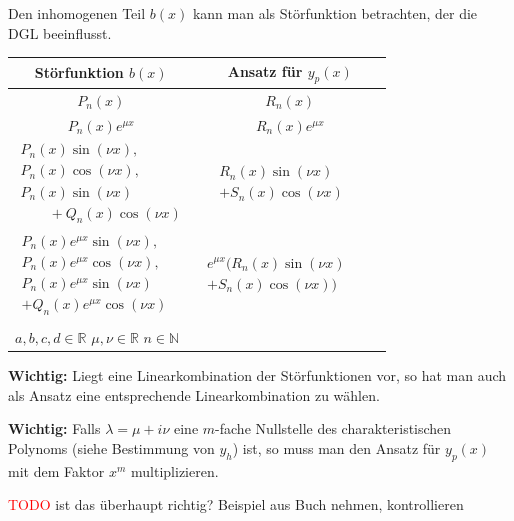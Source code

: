 \documentclass[a4paper,landscape,8pt]{extarticle}
\newcommand{\N}{\mathbb{N}}
\newcommand{\R}{\mathbb{R}}
\newcommand{\todo}{\textcolor{red}{TODO }}
\newcommand{\Wichtig}{\textbf{Wichtig: }}
\begin{document}
\begin{multicols*}{4}
\begin{warmup}
Den inhomogenen Teil $b(x)$ kann man als Störfunktion betrachten, der die
DGL beeinflusst.
\end{warmup}

\begin{table}[H]
\centering
\begin{tabular}{cc}
\toprule
\textbf{Störfunktion} $b(x)$ & \textbf{Ansatz für} $y_p(x)$\\
\midrule
$P_n(x)$ & $R_n(x)$
\\
\hline
$P_n(x)e^{\mu x}$ & $R_n(x)e^{\mu x}$
\\
\hline
$\begin{matrix}
P_n(x)\sin(\nu x),\\
P_n(x)\cos(\nu x),\\
P_n(x)\sin(\nu x)\qquad\\
\qquad + Q_n(x)\cos(\nu x)
\end{matrix}$
& 
$\begin{matrix}R_n(x)\sin(\nu x)\qquad\\ + S_n(x)\cos(\nu x)\end{matrix}$
\\
\hline
$\begin{matrix}
P_n(x)e^{\mu x}\sin(\nu x),\\
P_n(x)e^{\mu x}\cos(\nu x),\\
P_n(x)e^{\mu x}\sin(\nu x)\qquad\\
+ Q_n(x)e^{\mu x}\cos(\nu x)
\end{matrix}$
&
$\begin{matrix}e^{\mu x}(R_n(x)\sin(\nu x)\qquad\\ + S_n(x)\cos(\nu
x))\end{matrix}$\\
\bottomrule
\\
\multicolumn{2}{l}{$a,b,c,d\in \R$ \quad $\mu,\nu\in\R$ \quad $n\in \N$}
\end{tabular}
\end{table}

\Wichtig Liegt eine Linearkombination der Störfunktionen vor, so hat man auch
als Ansatz eine entsprechende Linearkombination zu wählen.

\Wichtig Falls $\lambda=\mu + i\nu$ eine $m$-fache Nullstelle des
charakteristischen Polynoms (siehe Bestimmung von $y_h$) ist, so muss man
 den Ansatz für $y_p(x)$ mit dem Faktor $x^m$ multiplizieren.

\begin{warmup}
\todo ist das überhaupt richtig? Beispiel aus Buch nehmen, kontrollieren
\end{warmup}


\end{multicols*}
\end{document}
